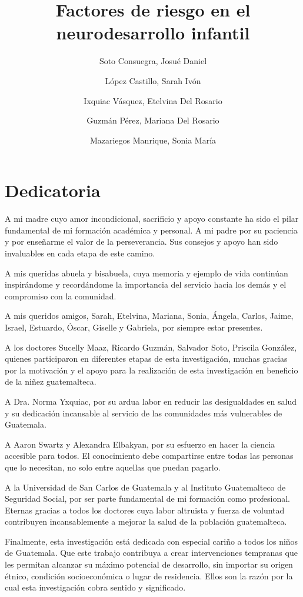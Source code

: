 \documentclass[11pt,letterpaper]{report}
\title{Factores de riesgo en el neurodesarrollo infantil}
\author{Soto Consuegra, Josué Daniel \and López Castillo, Sarah Ivón \and
Ixquiac Vásquez, Etelvina Del Rosario \and Guzmán Pérez, Mariana Del Rosario
\and Mazariegos Manrique, Sonia María}
\begin{document}






\chapter*{Dedicatoria}
A mi madre cuyo amor incondicional, sacrificio y  apoyo constante
ha sido el pilar fundamental de mi formación académica y personal. A mi padre
por su paciencia y por enseñarme el valor de la perseverancia. Sus consejos y
apoyo han sido invaluables en cada etapa de este camino.

A mis queridas abuela y bisabuela, cuya memoria y ejemplo de vida continúan
inspirándome y recordándome la importancia del servicio hacia los demás y el
compromiso con la comunidad.

A mis queridos amigos, Sarah, Etelvina, Mariana, Sonia, Ángela, Carlos, Jaime,
Israel, Estuardo, Óscar, Giselle y Gabriela, por siempre estar presentes.

A los doctores Sucelly Maaz, Ricardo Guzmán, Salvador Soto, Priscila González,
quienes participaron en diferentes etapas de esta investigación, muchas gracias
por la motivación y el apoyo para la realización de esta investigación en
beneficio de la niñez guatemalteca.

A Dra. Norma Yxquiac, por su ardua labor en reducir las desigualdades en salud y
su dedicación incansable al servicio de las comunidades más vulnerables de
Guatemala.

A Aaron Swartz y Alexandra Elbakyan, por su esfuerzo en hacer la ciencia
accesible para todos. El conocimiento debe compartirse entre todas 
las personas que lo necesitan, no solo entre aquellas que puedan pagarlo.

A la Universidad de San Carlos de Guatemala y al Instituto Guatemalteco de 
Seguridad Social, por ser parte fundamental de mi formación como profesional. 
Eternas gracias a todos los doctores cuya labor altruista y fuerza de voluntad 
contribuyen incansablemente a mejorar la salud de la población guatemalteca.

Finalmente, esta investigación está dedicada con especial cariño a todos los 
niños de Guatemala. Que este trabajo contribuya a crear intervenciones tempranas 
que les permitan alcanzar su máximo potencial de desarrollo, sin importar su 
origen étnico, condición socioeconómica o lugar de residencia. Ellos son la 
razón por la cual esta investigación cobra sentido y significado.
\end{document}
